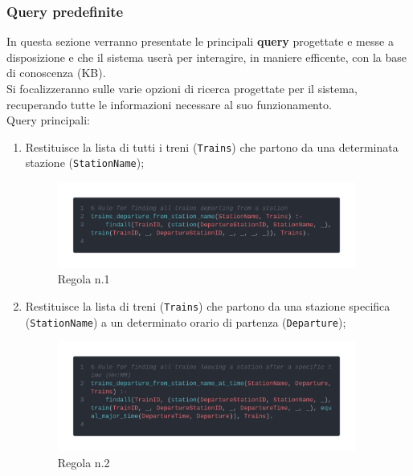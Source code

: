 \documentclass[italian,12pt,a4paper]{article}
\begin{document}
			\subsubsection{Query predefinite}
				In questa sezione verranno presentate le principali \textbf{query} progettate e messe a disposizione e che il sistema userà per interagire, in maniere efficente, con la base di conoscenza (KB).\\
				\linebreak
				Si focalizzeranno sulle varie opzioni di ricerca progettate per il sistema, recuperando tutte le informazioni necessare al suo funzionamento. \\
				\linebreak
				Query principali:
				
				
				\begin{enumerate}
					\item Restituisce la lista di tutti i treni (\texttt{Trains}) che partono da una determinata stazione (\texttt{StationName});
						\begin{figure}[h]
							\centering
							\includegraphics[width=370px]{img/code1}
							\caption{Regola n.1}
						\end{figure}
						
					\item Restituisce la lista di treni (\texttt{Trains}) che partono da una stazione specifica (\texttt{StationName}) a un determinato orario di partenza (\texttt{Departure});
						\begin{figure}[h]
							\centering
							\includegraphics[width=370px]{img/code2}
							\caption{Regola n.2}
			

\end{figure}
\end{enumerate}
\end{document}
